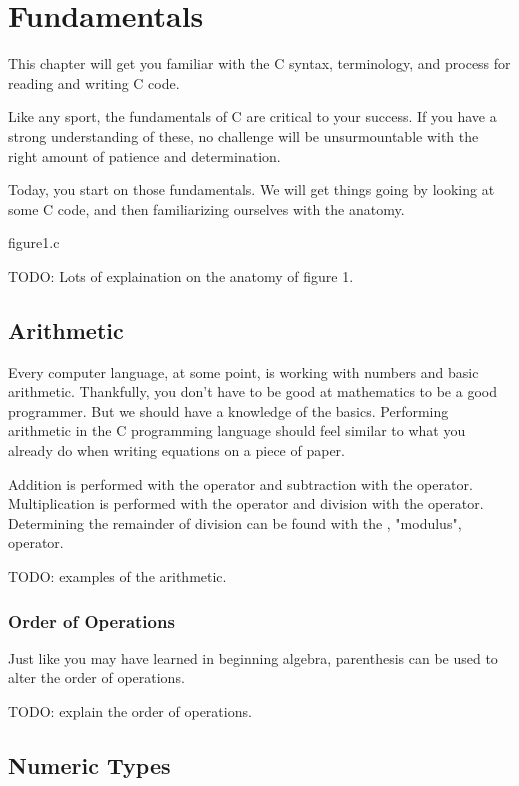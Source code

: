 \chapter{Fundamentals}

This chapter will get you familiar with the C syntax, terminology, and
process for reading and writing C code.

Like any sport, the fundamentals of C are critical to your success. If you have
a strong understanding of these, no challenge will be unsurmountable with the
right amount of patience and determination.

Today, you start on those fundamentals. We will get things going by looking at
some C code, and then familiarizing ourselves with the anatomy.


\begin{code}{figure1.c}

\end{code}


TODO: Lots of explaination on the anatomy of figure 1.


\section{Arithmetic}

Every computer language, at some point, is working with numbers and basic
arithmetic. Thankfully, you don't have to be good at mathematics to be a good
programmer. But we should have a knowledge of the basics. Performing arithmetic
in the C programming language should feel similar to what you already do when
writing equations on a piece of paper.

Addition is performed with the \ident{+} operator and subtraction with the
\ident{-} operator. Multiplication is performed with the \ident{*} operator and
division with the \ident{/} operator. Determining the remainder of division can
be found with the \ident{\%}, "modulus", operator.

TODO: examples of the arithmetic.

\subsection{Order of Operations}

Just like you may have learned in beginning algebra, parenthesis can be used
to alter the order of operations.

TODO: explain the order of operations.

\section{Numeric Types}

